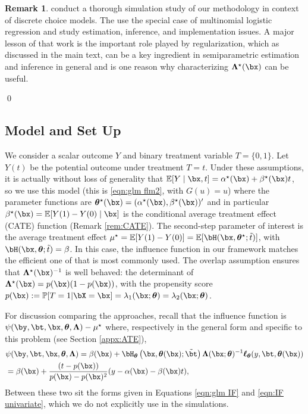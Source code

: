 \documentclass[12pt]{article}
\numberwithin{equation}{section}
\theoremstyle{definition}
\newtheorem{remarkTmp}{Remark}
\newenvironment{remark}
	{\medskip  \begin{remarkTmp} 	}
	{ 
		\renewcommand{\qedsymbol}{$\clubsuit$}
		\qed 
		\end{remarkTmp} 
	}
\newcommand{\E}{\mathbb{E}}
\renewcommand{\P}{\mathbb{P}}
\newcommand{\btheta}{\boldsymbol{\theta}}
\newcommand{\bL}{\boldsymbol{\Lambda}}
\newcommand{\mtrue}{\mu^\star}
\newcommand{\bttrue}{\btheta^\star}
\newcommand{\atrue}{\alpha^\star}
\newcommand{\btrue}{\beta^\star}
\newcommand{\bLtrue}{\bL^\star}
\newcommand{\btstar}{\tilde{\bt}}
\newcommand{\tstar}{\tilde{t}}
\begin{document}
\begin{appendices}
\begin{remark}
    \cite{Hetzenecker-Osterhaus2024_WP} conduct a thorough simulation study of our methodology in context of discrete choice models. The use the special case of multinomial logistic regression and study estimation, inference, and implementation issues. A major lesson of that work is the important role played by regularization, which as discussed in the main text, can be a key ingredient in semiparametric estimation and inference in general and is one reason why characterizing $\bLtrue(\bx)$ can be useful. 
\end{remark}




\subsection{Model and Set Up}


We consider a scalar outcome $Y$ and binary treatment variable $T = \{0,1\}$. Let $Y(t)$ be the potential outcome under treatment $T = t$. Under these assumptions, it is actually without loss of generality that $\E[Y \mid \bx, t] = \atrue(\bx) + \btrue(\bx) t$, so we use this model (this is \eqref{eqn:glm flm2}, with $G(u) = u$) where the parameter functions are $\bttrue(\bx) = (\atrue(\bx), \btrue(\bx))'$ and in particular $\btrue(\bx) = \E[Y(1) - Y(0) \mid \bx]$ is the conditional average treatment effect (CATE) function (Remark \ref{rem:CATE}). The second-step parameter of interest is the average treatment effect $\mtrue = \E[Y(1) - Y(0)] = \E[\bH(\bx,\bttrue; \tstar)]$, with $\bH(\bx,\btheta; \tstar) = \beta$. In this case, the influence function in our framework matches the efficient one of \cite{Hahn1998_Ecma} that is most commonly used. The overlap assumption ensures that $\bLtrue(\bx)^{-1}$ is well behaved: the determinant of $\bLtrue(\bx) = p(\bx)(1-p(\bx))$, with the propensity score $p(\bx) := \P[T = 1 \vert \bX = \bx] = \lambda_1(\bx; \btheta) = \lambda_2(\bx; \btheta)$. 

For discussion comparing the approaches, recall that the influence function is $\psi(\by,\bt,\bx, \btheta, \bL) - \mtrue$ where, respectively in the general form and specific to this problem (see Section \ref{appx:ATE}),
\begin{align*}
    & \psi(\by,\bt,\bx, \btheta, \bL)  = \beta(\bx)   + \bH_{\btheta}\left(\bx, \btheta(\bx ); \btstar\right) \bL(\bx; \btheta)^{-1} \bm{\ell}_{\btheta}(y,\bt, \btheta(\bx))           \\
    & = \beta(\bx) +  \frac{ ( t - p(\bx) )  }{p(\bx) - p(\bx)^2}  (y - \alpha(\bx) - \beta(\bx) t ) ,
\end{align*}
Between these two sit the forms given in Equations \eqref{eqn:glm IF} and \eqref{eqn:IF univariate}, which we do not explicitly use in the simulations. 


\end{appendices}
\end{document}
